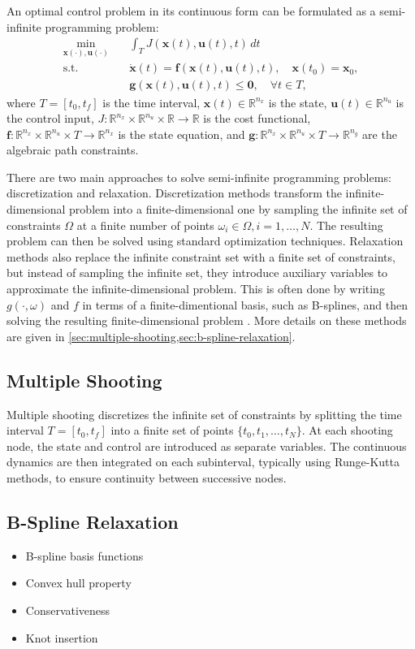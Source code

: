 An optimal control problem in its continuous form can be formulated as a semi-infinite programming problem:
\begin{equation}\label{eq:optimal-control-problem}
    \begin{aligned}
        \min_{\mathbf{x}(\cdot), \mathbf{u}(\cdot)} \quad & \int_{T} J(\mathbf{x}(t), \mathbf{u}(t), t) \, dt \\
        \text{s.t.} \quad & \dot{\mathbf{x}}(t) = \mathbf f(\mathbf{x}(t), \mathbf{u}(t), t), \quad \mathbf{x}(t_0) = \mathbf{x}_0, \\
        & \mathbf g(\mathbf{x}(t), \mathbf{u}(t), t) \leq \mathbf 0, \quad \forall t \in T,
    \end{aligned}
\end{equation}
where $T = [t_0, t_f]$ is the time interval, $\mathbf{x}(t) \in \mathbb R^{n_x}$ is the state, $\mathbf{u}(t) \in \mathbb R^{n_u}$ is the control input, $J : \mathbb R^{n_x} \times \mathbb R^{n_u} \times \mathbb R \to \mathbb R$ is the cost functional, $\mathbf f : \mathbb R^{n_x} \times \mathbb R^{n_u} \times T \to \mathbb R^{n_x}$ is the state equation, and $\mathbf g : \mathbb R^{n_x} \times \mathbb R^{n_u} \times T \to \mathbb R^{n_g}$ are the algebraic path constraints.

There are two main approaches to solve semi-infinite programming problems: discretization and relaxation. Discretization methods transform the infinite-dimensional problem into a finite-dimensional one by sampling the infinite set of constraints $\Omega$ at a finite number of points $\omega_i \in \Omega, i = 1, \ldots, N$. The resulting problem can then be solved using standard optimization techniques. Relaxation methods also replace the infinite constraint set with a finite set of constraints, but instead of sampling the infinite set, they introduce auxiliary variables to approximate the infinite-dimensional problem. This is often done by writing $g(\cdot, \omega)$ and $f$ in terms of a finite-dimentional basis, such as B-splines, and then solving the resulting finite-dimensional problem \citep{Dierckx1993}. More details on these methods are given in \cref{sec:multiple-shooting,sec:b-spline-relaxation}.

\subsection{Multiple Shooting}\label{sec:multiple-shooting}
Multiple shooting discretizes the infinite set of constraints by splitting the time interval $T = [t_0,t_f]$ into a finite set of points $\{t_0, t_1, \ldots, t_N\}$. At each shooting node, the state and control are introduced as separate variables. The continuous dynamics are then integrated on each subinterval, typically using Runge-Kutta methods, to ensure continuity between successive nodes.
 
\subsection{B-Spline Relaxation}\label{sec:b-spline-relaxation}
\begin{itemize}
    \item B-spline basis functions
    \item Convex hull property
    \item Conservativeness
    \item Knot insertion
\end{itemize}
